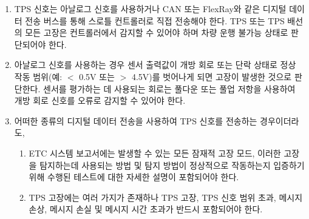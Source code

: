 \documentclass[final,a4paper,10pt]{report}
\begin{document}
\begin{enumerate}
\begin{enumerate}
      \item\label{rule:formula-technical.electronic-throttle-control.tps.signal-and-fault-handling} TPS 신호는 아날로그 신호를 사용하거나 CAN 또는 FlexRay와 같은 디지털 데이터 전송 버스를 통해 스로틀 컨트롤러로 직접 전송해야 한다. TPS 또는 TPS 배선의 모든 고장은 컨트롤러에서 감지할 수 있어야 하며 차량 운행 불가능 상태로 판단{\color{blue}되어야} 한다.
      \item\label{rule:formula-technical.electronic-throttle-control.tps.analog-fault-detection} 아날로그 신호를 사용하는 경우 {\color{blue}센서 출력값이} 개방 회로 또는 단락 상태로 정상 작동 범위(예: $<$ 0.5V 또는 $>$ 4.5V)를 벗어나게 되면 고장이 발생한 것으로 {\color{blue}판단}한다. 센서를 평가하는 데 사용되는 회로는 풀다운 또는 풀업 저항을 사용하여 {\color{blue}개방 회로 신호를 오류로 감지할 수 있어야} 한다.

      \item\label{rule:formula-technical.electronic-throttle-control.tps.digital-fault-handling} {\color{blue}어떠한} 종류의 디지털 데이터 전송을 사용하여 TPS 신호를 전송하는 경우{\color{blue}이더라도},
        \begin{enumerate}
          \item\label{rule:formula-technical.electronic-throttle-control.tps.digital-fault-handling.failure-modes-in-etcsf} ETC 시스템 보고서에는 발생할 수 있는 모든 잠재적 고장 모드, 이러한 고장을 탐지하는데 사용되는 방법 및 탐지 방법이 정상적으로 작동하는지 입증하기 위해 수행된 테스트에 대한 자세한 설명이 포함되어야 한다.
          \item\label{rule:formula-technical.electronic-throttle-control.tps.digital-fault-handling.minimum-failure-modes} {\color{blue}TPS 고장에는 여러 가지가 존재하나} TPS 고장, TPS 신호 범위 초과, 메시지 손상, 메시지 손실 및 {\color{blue}메시지} 시간 초과가 반드시 포함되어야 한다.
        \end{enumerate}
    \end{enumerate}


\end{enumerate}
\end{document}
